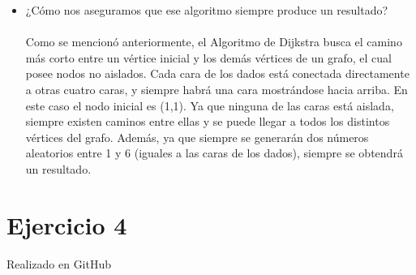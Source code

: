 \documentclass{article}
\begin{document}
\begin{itemize}
		\item{¿Cómo nos aseguramos que ese algoritmo siempre produce un resultado?}\\\\
		Como se mencionó anteriormente, el Algoritmo de Dijkstra busca el camino más corto entre un vértice inicial y los demás vértices de un grafo, el cual posee nodos no aislados. Cada cara de los dados está conectada directamente a otras cuatro caras, y siempre habrá una cara mostrándose hacia arriba. En este caso el nodo inicial es (1,1). Ya que ninguna de las caras está aislada, siempre existen caminos entre ellas y se puede llegar a todos los distintos vértices del grafo. Además, ya que siempre se generarán dos números aleatorios entre 1 y 6 (iguales a las caras de los dados), siempre se obtendrá un resultado.
		
	\end{itemize}
\section*{Ejercicio 4}
Realizado en GitHub
\end{document}
